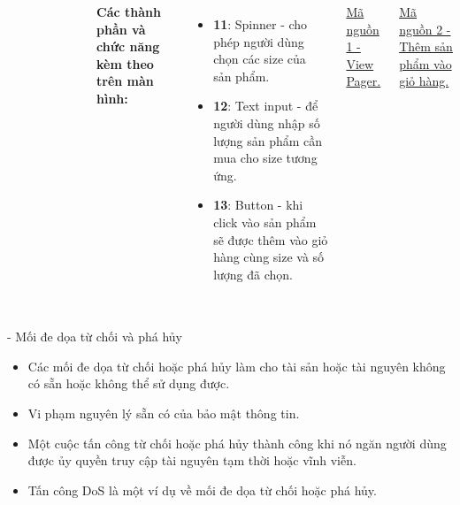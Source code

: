 \documentclass{beamer}
\begin{document}
\begin{frame}
\begin{columns}
\begin{figure}
        \end{figure}
        \indent \textbf{Các thành phần và chức năng kèm theo trên màn hình:}
        \begin{itemize}
            \item \textbf{11}: Spinner - cho phép người dùng chọn các size của sản phẩm.
            \item \textbf{12}: Text input - để người dùng nhập số lượng sản phẩm cần mua cho size tương ứng.
            \item \textbf{13}: Button - khi click vào sản phẩm sẽ được thêm vào giỏ hàng cùng size và số lượng đã chọn.         
        \end{itemize}

        \href{https://github.com/cuongpiger/Sharing/blob/main/Clover/SignInFragment.java}{\color{blue} Mã nguồn 1 - View Pager.}

        \href{https://github.com/cuongpiger/Sharing/blob/main/Clover/SignInFragment.java}{\color{blue} Mã nguồn 2 - Thêm sản phẩm vào giỏ hàng.}
    \end{columns}
\end{frame}

\begin{frame}
    \frametitle{}
    \begin{block}{ - Mối đe dọa từ chối và phá hủy}

        \begin{itemize}
            \item Các mối đe dọa từ chối hoặc phá hủy làm cho tài sản hoặc tài nguyên không có sẵn hoặc không thể sử dụng được.
            \item Vi phạm nguyên lý sẵn có của bảo mật thông tin.
            \item Một cuộc tấn công từ chối hoặc phá hủy thành công khi nó ngăn người dùng được ủy quyền truy cập tài nguyên tạm thời hoặc vĩnh viễn.
            \item Tấn công DoS là một ví dụ về mối đe dọa từ chối hoặc phá hủy.
        \end{itemize}
    \end{block}
\end{frame}

\end{document}
